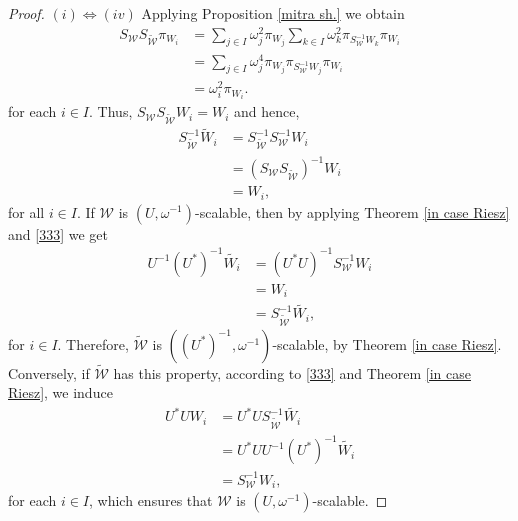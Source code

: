 \documentclass[sn-mathphys-num]{sn-jnl}%
\theoremstyle{definition}
\theoremstyle{remark}
\numberwithin{equation}{section}
\begin{document}
\begin{proof}
$(i)\Leftrightarrow (iv)$ Applying Proposition \ref{mitra sh.} we obtain
\begin{align*}
S_{\mathcal{W}}S_{\widetilde{\mathcal{W}}}\pi_{W_{i}}&=\sum_{j \in I}\omega_{j}^{2} \pi_{W_{j}}\sum_{k \in I}\omega_{k}^{2}\pi_{S_{\mathcal{W}}^{-1}W_{k}}\pi_{W_{i}}
\\&=\sum_{j \in I}\omega_{j}^{4}\pi_{W_{j}}\pi_{S_{\mathcal{W}}^{-1}W_{j}}\pi_{W_{i}}
\\&=\omega_{i}^{2}\pi_{W_{i}}.
\end{align*}
for each $i \in I.$ Thus, $S_{\mathcal{W}}S_{\widetilde{\mathcal{W}}}W_{i}=W_{i}$ and hence,
\begin{equation}\label{333}
\begin{aligned}
S_{\widetilde{\mathcal{W}}}^{-1}\widetilde{W}_{i}&=S_{\widetilde{\mathcal{W}}}^{-1}S_{\mathcal{W}}^{-1}W_{i}
\\&=\left( S_{\mathcal{W}}S_{\widetilde{\mathcal{W}}}\right) ^{-1}W_{i} 
\\&=W_{i},
\end{aligned}
\end{equation}
for all $i \in I$. If $\mathcal{W}$ is $\left( U,\omega^{-1}\right) $-scalable, then by applying Theorem \ref{in case Riesz} and \eqref{333} we get 
\begin{align*}
U^{-1}\left( U^{*}\right) ^{-1}\widetilde{W_{i}}&=\left( U^{*}U\right) ^{-1}S_{\mathcal{W}}^{-1}W_{i}
\\&=W_{i} 
\\&=S_{\widetilde{\mathcal{W}}}^{-1}\widetilde{W_{i}},
\end{align*}
for $i \in I$. Therefore, $\widetilde{\mathcal{W}}$ is $\left( \left( U^{*}\right) ^{-1},\omega^{-1}\right)$-scalable, by Theorem \ref{in case Riesz}. Conversely, if $\widetilde{\mathcal{W}}$ has this property, according to \eqref{333} and Theorem \ref{in case Riesz}, we induce
\begin{align*}
U^{*}UW_{i}&=U^{*}US_{\widetilde{\mathcal{W}}}^{-1}\widetilde{W_{i}} 
\\&=U^{*}U U^{-1}\left( U^{*}\right) ^{-1}\widetilde{W_{i}} 
\\&=S_{\mathcal{W}}^{-1}{W_{i}},
\end{align*}
for each $i \in I$, which ensures that $\mathcal{W}$ is $\left( U,\omega^{-1}\right) $-scalable. 
\end{proof}
\end{document}
